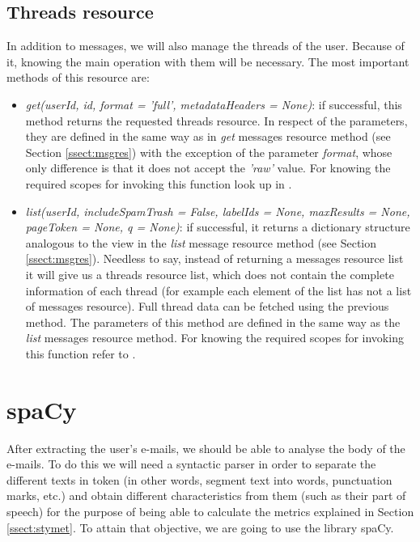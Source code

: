 \subsection{Threads resource}\label{ssect:threads}
In addition to messages, we will also manage the threads of the user. Because of it, knowing the main operation with them will be necessary. The most important methods of this resource are:
\begin{itemize}
	\item\textit{get(userId, id, format = 'full', metadataHeaders = None)}: if successful, this method returns the requested threads resource. In respect of the parameters, they are defined in the same way as in \textit{get} messages resource method (see Section \ref{ssect:msgres}) with the exception of the parameter \textit{format}, whose only difference is that it does not accept the \textit{'raw'} value. For knowing the required scopes for invoking this function look up in \cite[/v1/reference/users/threads/get]{gmailAPI}.
	\item\textit{list(userId, includeSpamTrash = False, labelIds = None, maxResults = None, pageToken = None, q = None)}: if successful, it returns a dictionary structure analogous to the view in the \textit{list} message resource method (see Section \ref{ssect:msgres}). Needless to say, instead of returning a messages resource list it will give us a threads resource list, which does not contain the complete information of each thread (for example each element of the list has not a list of messages resource). Full thread data can be fetched using the previous method. The parameters of this method are defined in the same way as the \textit{list} messages resource method. For knowing the required scopes for invoking this function refer to \cite[/v1/reference/users/threads/list]{gmailAPI}.
\end{itemize}

\section{spaCy}\label{sect:spacy}
After extracting the user's e-mails, we should be able to analyse the body of the e-mails. To do this we will need a syntactic parser in order to separate the different texts in token (in other words, segment text into words, punctuation marks, etc.) and obtain different characteristics from them (such as their part of speech) for the purpose of being able to calculate the metrics explained in Section \ref{ssect:stymet}. To attain that objective, we are going to use the library spaCy.

